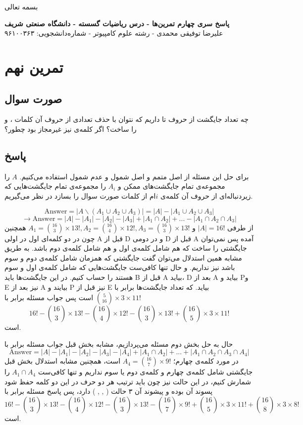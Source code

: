 \documentclass[12pt,a4paper]{article}
\begin{document}
\begin{center}
	بسمه تعالی
\end{center}
\begin{center}
	\textbf{
		پاسخ سری چهارم تمرین‌ها
		- درس ریاضیات گسسته - دانشگاه صنعتی شریف}
	\\
	علیرضا توفیقی محمدی - رشته علوم کامپیوتر - شماره‌دانشجویی: ۹۶۱۰۰۳۶۳
\end{center}
\section{تمرین نهم}
\subsection{صورت سوال}
چه تعداد جایگشت از حروف 
تا
داریم که نتوان با حذف تعدادی از حروف آن کلمات
،
و
را ساخت؟
اگر کلمه‌ی 
نیز غیرمجاز بود چطور؟
\subsection{پاسخ}
برای حل این مسئله از اصل متمم و اصل شمول و عدم شمول استفاده می‌کنیم.
$A$ 
را مجموعه‌ی تمام جایگشت‌های ممکن و $A_i$ را مجموعه‌ی تمام جایگشت‌هایی که زیردنباله‌ای از حروف آن کلمه‌ی $i$ام از کلمات صورت سوال را بسازد در نظر می‌گیریم.

\[
\text{Answer} = |A \backslash (A_1 \cup A_2 \cup A_3)|
 = |A| - |A_1 \cup A_2 \cup A_3|
\]
\[
\rightarrow \text{Answer} = |A| - |A_1| - |A_2| - |A_3| + |A_1\cap A_2| + ... - |A_1 \cap A_2 \cap A_3|
\]
از طرفی 
$|A| = 16!$
و
$A_1 = \binom{16}{3} \times 13!, A_2 = \binom{16}{4} \times 12! , 
A_3 = \binom{16}{3} \times 13!$
همچنین چون در دو کلمه‌ای اول در اولی A قبل از D و در دومی D قبل از A آمده پس نمی‌توان جایگشتی را ساخت که هم شامل کلمه‌ی اول و هم شامل کلمه‌ی دوم باشد. به طریق مشابه همین استدلال می‌توان گفت جایگشتی که همزمان شامل کلمه‌ی دوم و سوم باشد نیز نداریم. و حال تنها کافی‌ست جایگشت‌هایی که شامل کلمه‌ی اول و سوم هستند را حساب کنیم.
در این جایگشت‌ها باید B قبل از A بیاید، D بعد از A بیاید و Pو E نیز بعد از A بیایند و P نیز قبل از E بیاید. که تعداد جایگشت‌ها برابر با
$ \binom{5}{16}\times 3 \times 11!$
است پس جواب مسئله برابر با
\[
16! - \binom{16}{3} \times 13! - \binom{16}{4} \times 12! - \binom{16}{3} \times 13! + \binom{16}{5}\times 3 \times 11!
\]
است.

حال به حل بخش دوم مسئله می‌پردازیم، 
مشابه بخش قبل جواب مسئله برابر با
\[
\text{Answer} = |A| - |A_1| - |A_2| - |A_3| - |A_4| + |A_1\cap A_2| + ... + |A_1 \cap A_2 \cap A_3 \cap A_4|
\]
در مورد کلمه‌ی چهارم؛
$A_4 = \binom{16}{7} \times 9!$
است، همچنین مشابه استدلال بخش قبل جایگشتی شامل کلمه‌ی چهارم و کلمه‌ی دوم یا سوم نداریم و تنها کافی‌ست 
$A_1 \cap A_4$
را شمارش کنیم، در این حالت نیز چون باید ترتیب هر دو حرف در این دو کلمه حفظ شود پسوند آن 
بوده و پیشوند آن ۳ حالت (
, , )
دارد، پس پاسخ مسئله برابر با 
\[
16! - \binom{16}{3} \times 13! - \binom{16}{4} \times 12! - \binom{16}{3} \times 13! - \binom{16}{7}\times 9! + \binom{16}{5}\times 3 \times 11! + \binom{16}{8}\times 3 \times 8!
\]
است.
\end{document}
